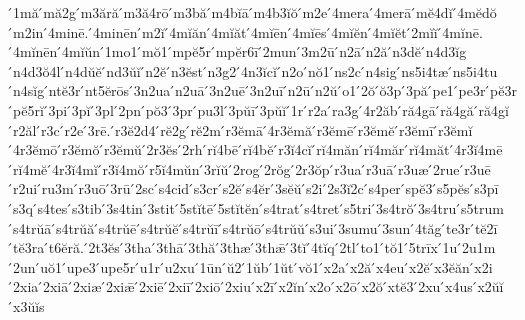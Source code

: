 {́1mă
́mă2g
́m3ără
́m3ă4rō
́m3bă
́m4bĭā
́m4b3ĭŏ
́m2e
́4mera
́4merā
́mĕ4dĭ
́4mĕdŏ
́m2in
́4minē.
́4minēn
́m2ĭ
́4mĭăn
́4mĭăt
́4mĭēn
́4mĭēs
́4mĭĕn
́4mĭĕt
́2mĭĭ
́4mĭnē.
́4mĭnēn
́4mĭŭn
́1mo1
́mŏ1
́mpĕ5r
́mpĕr6ī
́2mun
́3m2ū
́n2ā
́n2ă
́n3dĕ
́n4d3ĭg
́n4d3ŏ4l
́n4dŭĕ
́nd3ŭĭ
́n2ĕ
́n3ĕst
́n3g2
́4n3ĭcĭ
́n2o
́nŏ1
́ns2c
́n4sig
́ns5i4tæ
́ns5i4tu
́n4sĭg
́ntĕ3r
́nt5ĕrōs
́3n2ua
́n2uā
́3n2uē
́3n2uī
́n2ū
́n2ŭ
́o1
́2ŏ
́ŏ3p
́3pă
́pe1
́pe3r
́pĕ3r
́pĕ5rĭ
́3pi
́3pĭ
́3pl
́2pn
́pŏ3
́3pr
́pu3l
́3pŭī
́3pŭĭ
́1r
́r2a
́ra3g
́4r2ăb
́ră4gā
́ră4gă
́ră4gĭ
́r2ăl
́r3c
́r2e
́3rē.
́r3ĕ2d4
́rĕ2g
́rĕ2m
́r3ĕmā
́4r3ĕmă
́r3ĕmē
́r3ĕmĕ
́r3ĕmī
́r3ĕmĭ
́4r3ĕmō
́r3ĕmŏ
́r3ĕmŭ
́2r3ĕs
́2rh
́rĭ4bē
́rĭ4bĕ
́r3ĭ4cĭ
́rĭ4măn
́rĭ4măr
́rĭ4măt
́4r3ĭ4mē
́rĭ4mĕ
́4r3ĭ4mĭ
́r3ĭ4mŏ
́r5ĭ4mŭn
́3rĭŭ
́2rog
́2rŏg
́2r3ŏp
́r3ua
́r3uā
́r3uæ
́2rue
́r3uē
́r2ui
́ru3m
́r3uō
́3rū
́2sc
́s4cid
́s3cr
́s2ĕ
́s4ĕr
́3sĕŭ
́s2i
́2s3ĭ2c
́s4per
́spĕ3
́s5pĕs
́s3pī
́s3q
́s4tes
́s3tib
́3s4tin
́3stit
́5stĭtē
́5stĭtĕn
́s4trat
́s4tret
́s5tri
́3s4trŏ
́3s4tru
́s5trum
́s4trŭā
́s4trŭă
́s4trŭē
́s4trŭĕ
́s4trŭī
́s4trŭō
́s4trŭŭ
́s3ui
́3sumu
́3sun
́4tăg
́te3r
́tĕ2ī
́tĕ3ra
́t6ĕră.
́2t3ĕs
́3tha
́3thā
́3thă
́3thæ
́3thǣ
́3tĭ
́4tĭq
́2tl
́to1
́tŏ1
́5trīx
́1u
́2u1m
́2un
́uŏ1
́upe3
́upe5r
́u1r
́u2xu
́1ūn
́ŭ2
́1ŭb
́1ŭt
́vŏ1
́x2a
́x2ă
́x4eu
́x2ĕ
́x3ĕăn
́x2i
́2xia
́2xiā
́2xiæ
́2xiǣ
́2xiē
́2xiī
́2xiō
́2xiu
́x2ī
́x2ĭn
́x2o
́x2ō
́x2ŏ
́xtĕ3
́2xu
́x4us
́x2ŭĭ
́x3ŭĭs
}
